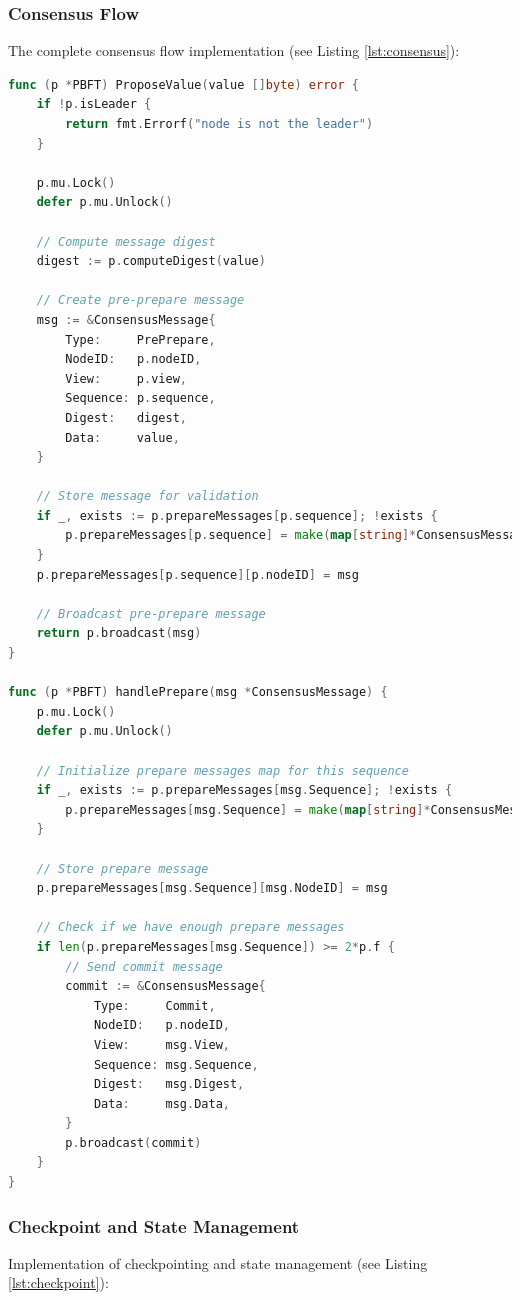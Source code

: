 \documentclass[12pt]{article}
\begin{document}
\clearpage
\subsubsection{Consensus Flow}
The complete consensus flow implementation (see Listing \ref{lst:consensus}):

\begin{lstlisting}[caption={Consensus Flow Implementation}, label={lst:consensus}, language=Go]
func (p *PBFT) ProposeValue(value []byte) error {
    if !p.isLeader {
        return fmt.Errorf("node is not the leader")
    }

    p.mu.Lock()
    defer p.mu.Unlock()

    // Compute message digest
    digest := p.computeDigest(value)

    // Create pre-prepare message
    msg := &ConsensusMessage{
        Type:     PrePrepare,
        NodeID:   p.nodeID,
        View:     p.view,
        Sequence: p.sequence,
        Digest:   digest,
        Data:     value,
    }

    // Store message for validation
    if _, exists := p.prepareMessages[p.sequence]; !exists {
        p.prepareMessages[p.sequence] = make(map[string]*ConsensusMessage)
    }
    p.prepareMessages[p.sequence][p.nodeID] = msg

    // Broadcast pre-prepare message
    return p.broadcast(msg)
}

func (p *PBFT) handlePrepare(msg *ConsensusMessage) {
    p.mu.Lock()
    defer p.mu.Unlock()

    // Initialize prepare messages map for this sequence
    if _, exists := p.prepareMessages[msg.Sequence]; !exists {
        p.prepareMessages[msg.Sequence] = make(map[string]*ConsensusMessage)
    }

    // Store prepare message
    p.prepareMessages[msg.Sequence][msg.NodeID] = msg

    // Check if we have enough prepare messages
    if len(p.prepareMessages[msg.Sequence]) >= 2*p.f {
        // Send commit message
        commit := &ConsensusMessage{
            Type:     Commit,
            NodeID:   p.nodeID,
            View:     msg.View,
            Sequence: msg.Sequence,
            Digest:   msg.Digest,
            Data:     msg.Data,
        }
        p.broadcast(commit)
    }
}
\end{lstlisting}

\clearpage
\subsubsection{Checkpoint and State Management}
Implementation of checkpointing and state management (see Listing \ref{lst:checkpoint}):
\end{document}
